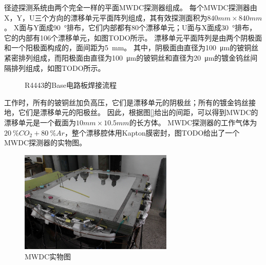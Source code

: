 径迹探测系统由两个完全一样的平面MWDC探测器组成。
每个MWDC探测器由X，Y，U三个方向的漂移单元平面阵列组成，其有效探测面积为$840mm \times 840mm$。
X面与Y面成\SI{90}{\degree}排布，它们内部都有80个漂移单元；U面与X面成\SI{30}{\degree}排布，它的内部有106个漂移单元，如图TODO所示。
漂移单元平面阵列是由两个阴极面和一个阳极面构成的，面间距为\SI{5}{mm}。
其中，阴极面由直径为\SI{100}{\micro\meter}的铍铜丝紧密排列组成，而阳极面由直径为\SI{100}{\micro\meter}的铍铜丝和直径为\SI{20}{\micro\meter}的镀金钨丝间隔排列组成，如图TODO所示。
\begin{figure}[htb]
\centering
{}
\caption{R4443的Base电路板焊接流程}
\label{fig:construction:soldering}
\end{figure}
工作时，所有的铍铜丝加负高压，它们是漂移单元的阴极丝；所有的镀金钨丝接地，它们是漂移单元的阳极丝。
因此，根据图\ref{}给出的间距，可以得到MWDC的漂移单元是一个截面为$10mm\times 10.5mm$的长方体。
MWDC探测器的工作气体为$\SI{20}{\percent}CO_2 + \SI{80}{\percent}Ar$，整个漂移腔体用Kapton膜密封，图TODO给出了一个MWDC探测器的实物图。
\begin{figure}[htbp]
	\centering
	\includegraphics[width=0.65\textwidth]{chap/cosmic_ray/fig/mwdc.jpg}
	\caption{MWDC实物图}
	\label{fig:cosmic_ray:mwdc}
\end{figure}
